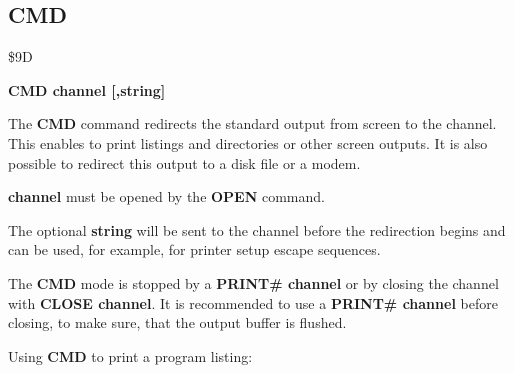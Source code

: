 
\newpage
\subsection{CMD}
\begin{description}[leftmargin=3cm,style=nextline]
\item [Token:] \$9D
\item [Format:] {\bf CMD channel [,string]}
\item [Usage:] The {\bf CMD} command redirects the standard output
               from screen to the channel. This enables to
               print listings and directories or other screen outputs.
               It is also possible to redirect this output to a disk file
               or a modem.

               {\bf channel} must be opened by the {\bf OPEN} command.

               The optional {\bf string} will be sent to the channel
               before the redirection begins and can be used,
               for example, for printer setup escape sequences.

\item [Remarks:] The {\bf CMD} mode is stopped by a {\bf PRINT\# channel}
                 or by closing the channel with {\bf CLOSE channel}.
                 It is recommended to use a {\bf PRINT\# channel}
                 before closing, to make sure, that the output buffer
                 is flushed.

\item [Example:] Using {\bf CMD} to print a program listing:
\end{description}


\newpage
